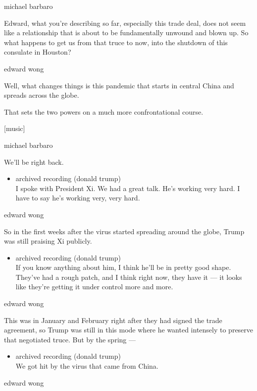 michael barbaro

Edward, what you're describing so far, especially this trade deal, does
not seem like a relationship that is about to be fundamentally unwound
and blown up. So what happens to get us from that truce to now, into the
shutdown of this consulate in Houston?

edward wong

Well, what changes things is this pandemic that starts in central China
and spreads across the globe.

That sets the two powers on a much more confrontational course.

{[}music{]}

michael barbaro

We'll be right back.

\begin{itemize}
\tightlist
\item
  archived recording (donald trump)\\
  I spoke with President Xi. We had a great talk. He's working very
  hard. I have to say he's working very, very hard.
\end{itemize}

edward wong

So in the first weeks after the virus started spreading around the
globe, Trump was still praising Xi publicly.

\begin{itemize}
\tightlist
\item
  archived recording (donald trump)\\
  If you know anything about him, I think he'll be in pretty good shape.
  They've had a rough patch, and I think right now, they have it --- it
  looks like they're getting it under control more and more.
\end{itemize}

edward wong

This was in January and February right after they had signed the trade
agreement, so Trump was still in this mode where he wanted intensely to
preserve that negotiated truce. But by the spring ---

\begin{itemize}
\tightlist
\item
  archived recording (donald trump)\\
  We got hit by the virus that came from China.
\end{itemize}

edward wong

